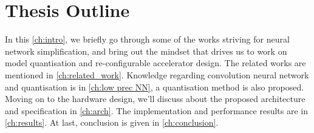 \section{Thesis Outline}
In this \autoref{ch:intro}, we briefly go through some of the works striving for neural network simplification, and bring out the mindset that drives us to work on model quantisation and re-configurable accelerator design. The related works are mentioned in \autoref{ch:related_work}. Knowledge regarding convolution neural network and quantisation is in \autoref{ch:low prec NN}, a quantisation method is also proposed. Moving on to the hardware design, we'll discuss about the proposed architecture and specification in \autoref{ch:arch}. The implementation and performance results are in \autoref{ch:results}. At last, conclusion is given in \autoref{ch:conclusion}.   \\
\iffalse
\begin{itemize}
    \item \textcolor{purple}{What's your research question?}
    \item \textcolor{purple}{What's your motivation for that research question, i.e. why would you investigate quantised CNN hardware?}
\end{itemize}
\fi